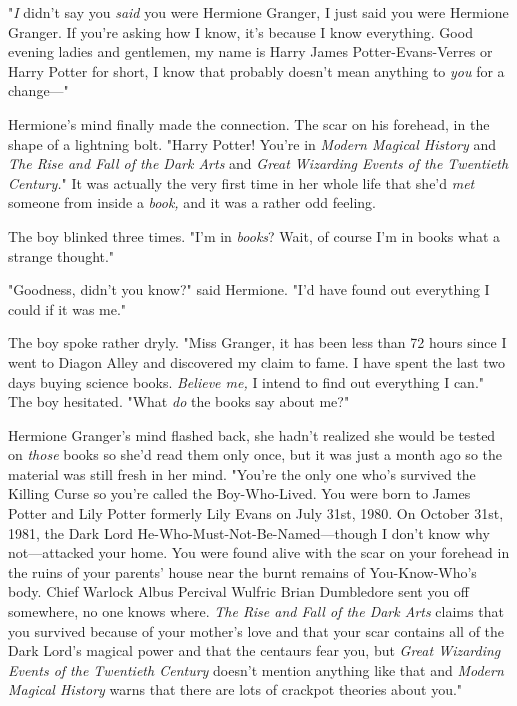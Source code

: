 "\emph{I} didn't say you \emph{said} you were Hermione Granger, I just said you
were Hermione Granger. If you're asking how I know, it's because I know
everything. Good evening ladies and gentlemen, my name is Harry James
Potter-Evans-Verres or Harry Potter for short, I know that probably doesn't
mean anything to \emph{you} for a change\mbox{---}"

Hermione's mind finally made the connection. The scar on his forehead, in the
shape of a lightning bolt. "Harry Potter! You're in \emph{Modern Magical
History} and \emph{The Rise and Fall of the Dark Arts} and \emph{Great
Wizarding Events of the Twentieth Century.}" It was actually the very first
time in her whole life that she'd \emph{met} someone from inside a \emph{book,}
and it was a rather odd feeling.

The boy blinked three times. "I'm in \emph{books}? Wait, of course I'm in
books{\el} what a strange thought."

"Goodness, didn't you know?" said Hermione. "I'd have found out everything I
could if it was me."

The boy spoke rather dryly. "Miss Granger, it has been less than 72 hours since
I went to Diagon Alley and discovered my claim to fame. I have spent the last
two days buying science books. \emph{Believe me,} I intend to find out
everything I can." The boy hesitated. "What \emph{do} the books say about me?"

Hermione Granger's mind flashed back, she hadn't realized she would be tested
on \emph{those} books so she'd read them only once, but it was just a month ago
so the material was still fresh in her mind. "You're the only one who's
survived the Killing Curse so you're called the Boy-Who-Lived. You were born to
James Potter and Lily Potter formerly Lily Evans on July 31st, 1980. On
October 31st, 1981, the Dark Lord He-Who-Must-Not-Be-Named---though I don't
know why not---attacked your home. You were found alive with the scar on your
forehead in the ruins of your parents' house near the burnt remains of
You-Know-Who's body. Chief Warlock Albus Percival Wulfric Brian Dumbledore sent
you off somewhere, no one knows where. \emph{The Rise and Fall of the Dark
Arts} claims that you survived because of your mother's love and that your scar
contains all of the Dark Lord's magical power and that the centaurs fear you,
but \emph{Great Wizarding Events of the Twentieth Century} doesn't mention
anything like that and \emph{Modern Magical History} warns that there are lots
of crackpot theories about you."

